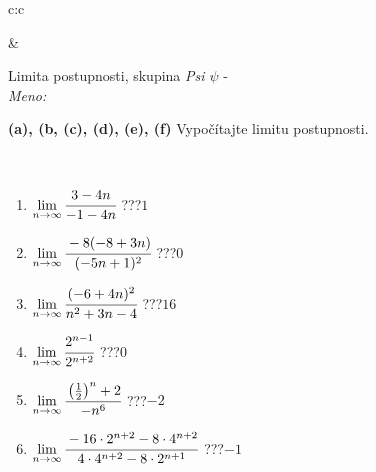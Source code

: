 \documentclass[10pt]{report}
\begin{document}
\begin{tabular}{c:c}
\begin{minipage}[c][104.5mm][t]{0.5\linewidth}
\begin{center}
\begin{minipage}{0.20\linewidth}
\begin{center}
\end{center}
\end{minipage}
\end{center}
\end{minipage}
&
\begin{minipage}[c][104.5mm][t]{0.5\linewidth}
\begin{center}
\vspace{5mm}
{\huge Limita postupnosti, skupina \textit{Psi $\psi$} -}\\[5mm]
\textit{Meno:}\phantom{xxxxxxxxxxxxxxxxxxxxxxxxxxxxxxxxxxxxxxxxxxxxxxxxxxxxxxxxxxxxxxxxx}\\[5mm]
\begin{minipage}{0.95\linewidth}
\begin{center}
{
\textbf{(a), (b, (c), (d), (e), (f)} Vypočítajte limitu postupnosti. \\[-1mm]
\phantom{x}
}
\end{center}
\end{minipage}
\\[1mm]
\begin{minipage}{0.79\linewidth}
\begin{center}
\begin{varwidth}{\linewidth}
\setlength{\itemsep}{0pt}
\begin{enumerate}
\normalsize
\item $\lim\limits_{n\to\infty}\cfrac{3-4n}{-1-4n}$\quad \dotfill\; ???\;\dotfill \quad $1$
\item $\lim\limits_{n\to\infty}\cfrac{-8(-8+3n)}{(-5n+1)^2}$\quad \dotfill\; ???\;\dotfill \quad $0$
\item $\lim\limits_{n\to\infty}\cfrac{(-6+4n)^2}{n^2+3n-4}$\quad \dotfill\; ???\;\dotfill \quad $16$
\item $\lim\limits_{n\to\infty}\cfrac{2^{n-1}}{2^{n+2}}$\quad \dotfill\; ???\;\dotfill \quad $0$
\item $\lim\limits_{n\to\infty}\cfrac{\left(\frac{1}{2}\right)^n +2}{-n^{6}}$\quad \dotfill\; ???\;\dotfill \quad $-2$
\item $\lim\limits_{n\to\infty}\cfrac{-16\cdot 2^{n+2}-8\cdot 4^{n+2}}{4\cdot 4^{n+2}-8\cdot 2^{n+1}}$\quad \dotfill\; ???\;\dotfill \quad $-1$
\end{enumerate}
\end{varwidth}
\end{center}
\end{minipage}
\begin{minipage}{0.20\linewidth}
\begin{center}

\end{center}
\end{minipage}
\end{center}
\end{minipage}
\end{tabular}
\end{document}
